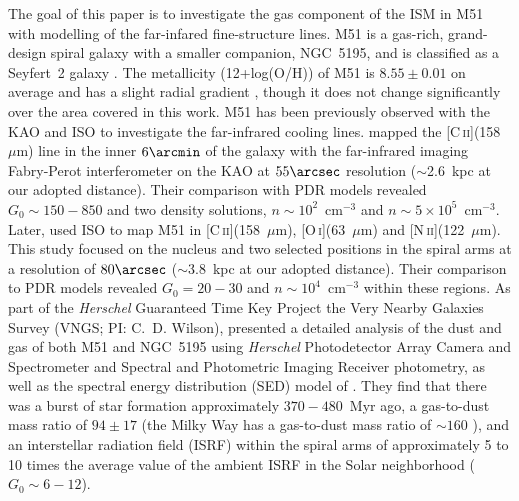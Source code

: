 \documentclass[preprint2]{aastex}
\begin{document}
The goal of this paper is to investigate the gas component of the ISM in M51 with modelling of the far-infared fine-structure lines.  M51 \citep[$D = 9.9$~Mpc; ][]{2009AstL...35..599T} is a gas-rich, grand-design spiral galaxy with a smaller companion, NGC~5195, and is classified as a Seyfert~2 galaxy \citep{1997ApJS..112..315H}.   The metallicity (12+log(O/H)) of M51 is $8.55 \pm 0.01$ on average and has a slight radial gradient \citep{2010ApJS..190..233M}, though it does not change significantly over the area covered in this work.  M51 has been previously observed with the KAO and ISO to investigate the far-infrared cooling lines.  \citet{2001ApJ...561..203N} mapped the [C\,\textsc{ii}](158~$\mu$m) line in the inner $6 \arcmin$ of the galaxy with the far-infrared imaging Fabry-Perot interferometer on the KAO at $55 \arcsec$ resolution ($\sim$2.6~kpc at our adopted distance).  Their comparison with PDR models revealed $G_0 \sim 150-850$ and two density solutions, $n \sim 10^{2}$~cm$^{-3}$ and $n \sim 5 \times 10^{5}$~cm$^{-3}$. Later, \citet{2005A&A...441..961K} used ISO to map M51 in [C\,\textsc{ii}](158~$\mu$m), [O\,\textsc{i}](63~$\mu$m) and [N\,\textsc{ii}](122~$\mu$m).  This study focused on the nucleus and two selected positions in the spiral arms at a resolution of $80\arcsec$ ($\sim$3.8~kpc at our adopted distance).  Their comparison to PDR models revealed $G_{0}=20-30$ and $n \sim 10^{4}$~cm$^{-3}$ within these regions.  As part of the \emph{Herschel} Guaranteed Time Key Project the Very Nearby Galaxies Survey (VNGS; PI: C.~D. Wilson), \citet{2012ApJ...755..165M} presented a detailed analysis of the dust and gas of both M51 and NGC~5195 using \emph{Herschel} Photodetector Array Camera and Spectrometer \citep[PACS; ][]{2010A&A...518L...2P} and Spectral and Photometric Imaging Receiver \citep[SPIRE; ][]{2010A&A...518L...3G} photometry, as well as the spectral energy distribution (SED) model of \citet{2007ApJ...657..810D}.  They find that there was a burst of star formation approximately $370 - 480$~Myr ago, a gas-to-dust mass ratio of $94 \pm 17$ (the Milky Way has a gas-to-dust mass ratio of $\sim 160$ \citep{2004ApJS..152..211Z}), and an interstellar radiation field (ISRF) within the spiral arms of approximately 5 to 10 times the average value of the ambient ISRF in the Solar neighborhood ($G_{0} \sim 6-12$).
\end{document}
